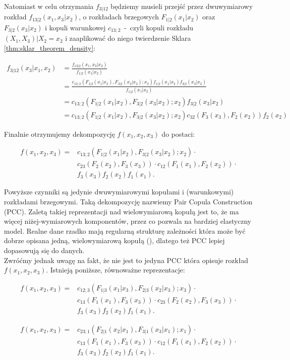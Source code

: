 Natomiast w celu otrzymania $f_{3|12}$ będziemy musieli przejść przez dwuwymiarowy rozkład $f_{13|2}(x_1, x_3|x_2)$, o rozkładach brzegowych $F_{1|2}(x_1|x_2)$ oraz $F_{3|2}(x_3|x_2)$ i kopuli warunkowej $c_{13;2}$~-~czyli kopuli rozkładu $(X_1, X_3) | X_2=x_2$ i zaaplikować do niego twierdzenie Sklara \ref{thm:sklar_theorem_density}:

\begin{equation*}
	\begin{split}
		f_{3|12}(x_3|x_1,x_2)  & = \frac{f_{13|2}(x_1, x_3|x_2)}{f_{1|2}(x_1|x_2)} \\
		& = \frac{c_{13;2}(F_{1|2}(x_1|x_2), F_{3|2}(x_3|x_2); x_2)f_{1|2}(x_1|x_2)f_{3|2}(x_3|x_2)}{f_{1|2}(x_1|x_2)}\\
		& = c_{13;2}(F_{1|2}(x_1|x_2), F_{3|2}(x_3|x_2); x_2)f_{3|2}(x_3|x_2) \\
		& = c_{13;2}(F_{1|2}(x_1|x_2), F_{3|2}(x_3|x_2); x_2)c_{32}(F_3(x_3), F_2(x_2))f_2(x_2)
	\end{split}
\end{equation*}

Finalnie otrzymujemy dekompozycję $f(x_1, x_2, x_3)$ do postaci:

\begin{equation}
	\begin{split}
	f(x_1, x_2, x_3) = &c_{13;2}(F_{1|2}(x_1|x_2), F_{3|2}(x_3|x_2); x_2) \cdot \\
	& c_{23}(F_2(x_2), F_3(x_3)) \cdot c_{12}(F_1(x_1), F_2(x_2)) \cdot \\
	& f_3(x_3)f_2(x_2)f_1(x_1).
	\end{split}
	\label{eq:PCC}
\end{equation}

Powyższe czynniki są jedynie dwuwymiarowymi kopułami i (warunkowymi) rozkładami brzegowymi. Taką dekompozycję nazwiemy Pair Copula Construction (PCC). Zaletą takiej reprezentacji nad wielowymiarową kopułą jest to, że ma więcej niżej-wymiarowych komponentów, przez co pozwala na bardziej elastyczny model. Realne dane rzadko mają regularną strukturę zależności która może być dobrze opisana jedną, wielowymiarową kopułą (\cite{Czado_Vine_Copulas}), dlatego też PCC lepiej dopasowują się do danych.\\
Zwróćmy jednak uwagę na fakt, że nie jest to jedyna PCC która opisuje rozkład $f(x_1, x_2, x_3)$. Istnieją poniższe, równoważne reprezentacje:

\begin{equation}
	\begin{split}
		f(x_1, x_2, x_3) = &c_{12;3}(F_{1|3}(x_1|x_3), F_{2|3}(x_2|x_3); x_3) \cdot \\
		& c_{13}(F_1(x_1), F_3(x_3)) \cdot c_{23}(F_2(x_2), F_3(x_3)) \cdot \\
		& f_3(x_3)f_2(x_2)f_1(x_1).
	\end{split}
\end{equation}

\begin{equation*}
	\begin{split}
		f(x_1, x_2, x_3) = &c_{23;1}(F_{2|1}(x_2|x_1), F_{3|1}(x_3|x_1); x_1) \cdot \\
		& c_{13}(F_1(x_1), F_3(x_3)) \cdot c_{12}(F_1(x_1), F_2(x_2)) \cdot \\
		& f_3(x_3)f_2(x_2)f_1(x_1).
	\end{split}
\end{equation*}